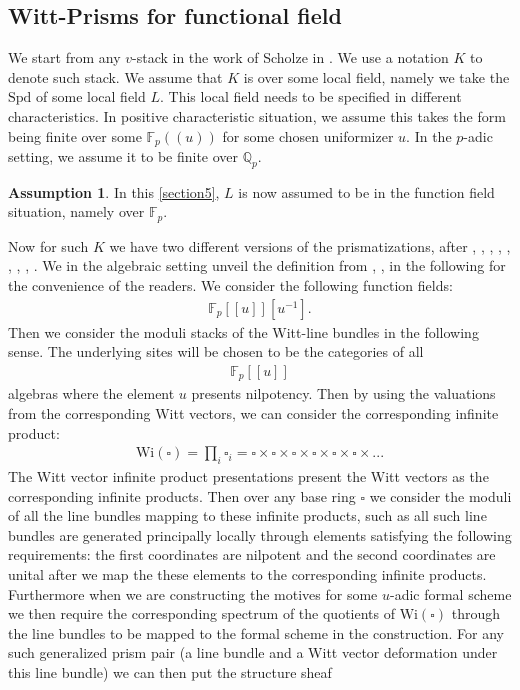 \documentclass[12pt]{article}
\theoremstyle{definition}
\newtheorem{assumption}{Assumption}
\begin{document}
\subsection{Witt-Prisms for functional field}
\indent We start from any $v$-stack in the work of Scholze in \cite{1S1}. We use a notation $K$ to denote such stack. We assume that $K$ is over some local field, namely we take the $\mathrm{Spd}$ of some local field $L$. This local field needs to be specified in different characteristics. In positive characteristic situation, we assume this takes the form being finite over some $\mathbb{F}_p((u))$ for some chosen uniformizer $u$. In the $p$-adic setting, we assume it to be finite over $\mathbb{Q}_p$. 
\begin{assumption}
In this \cref{section5}, $L$ is now assumed to be in the function field situation, namely over $\mathbb{F}_p$.
\end{assumption}
Now for such $K$ we have two different versions of the prismatizations, after \cite{1To1}, \cite{1To2}, \cite{1To3}, \cite{1To4}, \cite{1S4}, \cite{1ALBRCS}, \cite{1BS}, \cite{1D}, \cite{1BL}. We in the algebraic setting unveil the definition from \cite{1BS}, \cite{1D}, \cite{1BL} in the following for the convenience of the readers. We consider the following function fields:
\begin{align}
\mathbb{F}_p[[u]][u^{-1}].
\end{align}
Then we consider the moduli stacks of the Witt-line bundles in the following sense. The underlying sites will be chosen to be the categories of all 
\begin{align}
\mathbb{F}_p[[u]]
\end{align}
algebras where the element $u$ presents nilpotency. Then by using the valuations from the corresponding Witt vectors, we can consider the corresponding infinite product:
\begin{align}
\mathrm{Wi(\square)}=\prod_i \square_i = \square \times \square \times \square \times \square \times \square\times \square \times... 
\end{align} 
The Witt vector infinite product presentations present the Witt vectors as the corresponding infinite products. Then over any base ring $\square$ we consider the moduli of all the line bundles mapping to these infinite products, such as all such line bundles are generated principally locally through elements satisfying the following requirements: the first coordinates are nilpotent and the second coordinates are unital after we map the these elements to the corresponding infinite products. Furthermore when we are constructing the motives for some $u$-adic formal scheme we then require the corresponding spectrum of the quotients of $\mathrm{Wi}(\square)$ through the line bundles to be mapped to the formal scheme in the construction. For any such generalized prism pair (a line bundle and a Witt vector deformation under this line bundle) we can then put the structure sheaf
\end{document}
